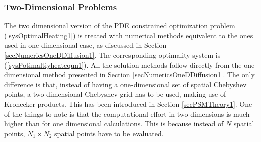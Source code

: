 \subsubsection{Two-Dimensional Problems}\label{sec2Dprobsnum1}
The two dimensional version of the PDE constrained optimization problem (\ref{sysOptimalHeating1}) is treated with numerical methods equivalent to the ones used in one-dimensional case, as discussed in Section \ref{secNumericsOneDDiffusion1}. 
The corresponding optimality system is (\ref{sysPotimaltiyheatequn1}).
All the solution methods follow directly from the one-dimensional method presented in Section \ref{secNumericsOneDDiffusion1}. The only difference is that, instead of having a one-dimensional set of spatial Chebyshev points, a two-dimensional Chebyshev grid has to be used, making use of Kronecker products. This has been introduced in Section \ref{secPSMTheory1}.
One of the things to note is that the computational effort in two dimensions is much higher than for one dimensional calculations. This is because instead of $N$ spatial points, $N_1 \times N_2$ spatial points have to be evaluated.

